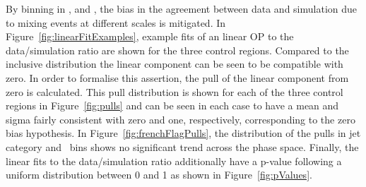 By binning in \scalht, \njet and \nb, the bias in the agreement 
between data and simulation due to mixing events at different scales is mitigated. 
In Figure~\ref{fig:linearFitExamples}, example fits of an linear OP to the data/simulation ratio 
are shown for the three control regions. Compared to the inclusive distribution
the linear component can be seen to be compatible with zero. In order to formalise this assertion,
the pull of the linear component from zero is calculated.
This pull distribution is shown for each of the three control regions 
in Figure~\ref{fig:pulls} and can be seen in each case to have a mean and sigma fairly 
consistent with zero and one, respectively, corresponding to the zero bias hypothesis.
In Figure~\ref{fig:frenchFlagPulls}, the distribution of the pulls 
in jet category and \scalht~bins shows no significant trend across the phase space.
Finally, the linear fits to the data/simulation ratio additionally have a p-value following 
a uniform distribution between 0 and 1 as shown in Figure~\ref{fig:pValues}.

